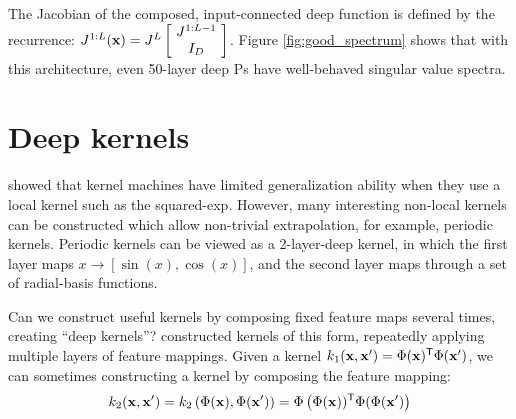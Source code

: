 \documentclass[twoside]{article}
\makeatletter
\newlength{\nonHumbleHeight}
\def\@humbleformat#1{{\settoheight{\nonHumbleHeight}{#1}\resizebox{!}{0.94\nonHumbleHeight}{#1}}}%
\def\humble#1{\@humbleformat{#1}}%
\newcommand{\gp}{{\humble GP}}
\newcommand{\MLP}{{\humble MLP}}
\newcommand{\sectiondist}{}
\makeatother
\begin{document}
The Jacobian of the composed, input-connected deep function is defined by the recurrence:
%
\newcommand{\sbi}[2]{\left[ \! \begin{array}{c} #1 \\ #2 \end{array} \! \right]} 
$J^{1:L}(\vx) = J^L \sbi{ J^{1:L-1}}{I_D}$.
%
%
%
Figure \ref{fig:good_spectrum} shows that with this architecture, even 50-layer deep \gp{}s have well-behaved singular value spectra.






\section{Deep kernels}
\label{sec:deep_kernels}
\sectiondist

\cite{NIPS2005_424} showed that kernel machines have limited generalization ability when they use a local kernel such as the squared-exp.
However, many interesting non-local kernels can be constructed which allow non-trivial extrapolation, for example, periodic kernels.
Periodic kernels can be viewed as a 2-layer-deep kernel, in which the first layer maps $x \rightarrow [\sin(x), \cos(x)]$, and the second layer maps through a set of radial-basis functions.

 
Can we construct useful kernels by composing fixed feature maps several times, creating ``deep kernels''?  \citet{cho2012kernel} constructed kernels of this form, repeatedly applying multiple layers of feature mappings.
Given a kernel $k_1({\bf{x}}, {\bf{x}}') = \Phi({\bf{x}}) {^\mathsf{T}} \Phi({\bf{x}}')$, we can sometimes constructing a kernel by composing the feature mapping:
\begin{align}
k_2({\bf{x}}, {\bf{x}}') 
 = k_2 \left(\Phi({\bf{x}}), \Phi({\bf{x}}') \right)
 = \Phi \left( \Phi({\bf{x}})) {^\mathsf{T}} \Phi(\Phi({\bf{x}}') \right) \nonumber
\end{align}
%
\end{document}
